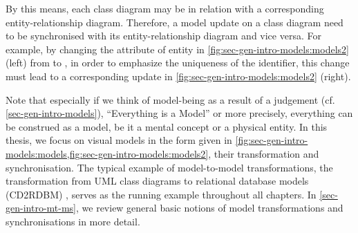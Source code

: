 By this means, each class diagram may be in relation with a corresponding entity-relationship diagram.
Therefore, a model update on a class diagram need to be synchronised with its entity-relationship diagram and vice versa.
For example, by changing the attribute of entity  in \cref{fig:sec-gen-intro-models:models2} (left) from  to , in order to emphasize the uniqueness of the identifier, this change must lead to a corresponding update in \cref{fig:sec-gen-intro-models:models2} (right).

Note that especially if we think of model-being as a result of a judgement (cf. \cref{sec-gen-intro-models}), ``Everything is a Model'' \cite{Bezivin2005} or more precisely, everything can be construed as a model, be it a mental concept or a physical entity.
In this thesis, we focus on visual models in the form given in \cref{fig:sec-gen-intro-models:models,fig:sec-gen-intro-models:models2}, their transformation and synchronisation.
The typical example of model-to-model transformations, the transformation from UML class diagrams to relational database models (CD2RDBM) \cite{FAGT2}, serves as the running example throughout all chapters.
In \cref{sec-gen-intro-mt-ms}, we review general basic notions of model transformations and synchronisations in more detail.
